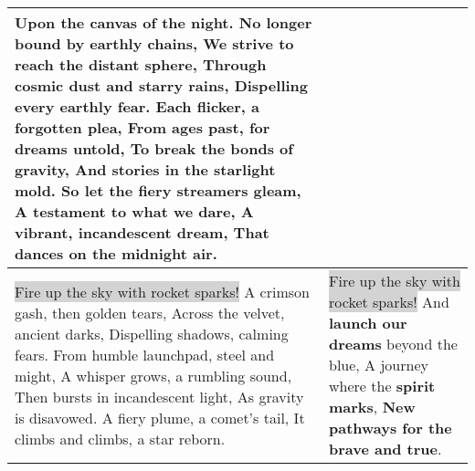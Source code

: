 \begin{table*}[h!]
{\begin{tabular}{p{} p{}}
Upon the canvas of the night. \newline
\newline
No longer bound by earthly chains, \newline
We strive to reach the distant sphere, \newline
Through \textbf{cosmic dust and starry rains}, \newline
\textbf{Dispelling every earthly fear}. \newline
\newline
Each flicker, a \textbf{forgotten plea}, \newline
From ages past, for dreams untold, \newline
To \textbf{break the bonds of gravity}, \newline
And \textbf{stories in the starlight mold}. \newline
\newline
So let the fiery streamers gleam, \newline
A \textbf{testament to what we dare}, \newline
A vibrant, \textbf{incandescent dream}, \newline
That dances on the midnight air. \\
\midrule
\colorbox{LightGray}{Fire up the sky with rocket sparks!} \newline
A crimson gash, then golden tears, \newline
Across the velvet, ancient darks, \newline
Dispelling shadows, calming fears. \newline
\newline
From humble launchpad, steel and might, \newline
A whisper grows, a rumbling sound, \newline
Then bursts in incandescent light, \newline
As gravity is disavowed. \newline
\newline
A fiery plume, a comet's tail, \newline
It climbs and climbs, a star reborn.
&
\colorbox{LightGray}{Fire up the sky with rocket sparks!} \newline
And \textbf{launch our dreams} beyond the blue, \newline
A journey where the \textbf{spirit marks}, \newline
\textbf{New pathways for the brave and true}. \newline

\end{tabular}}
\end{table*}
